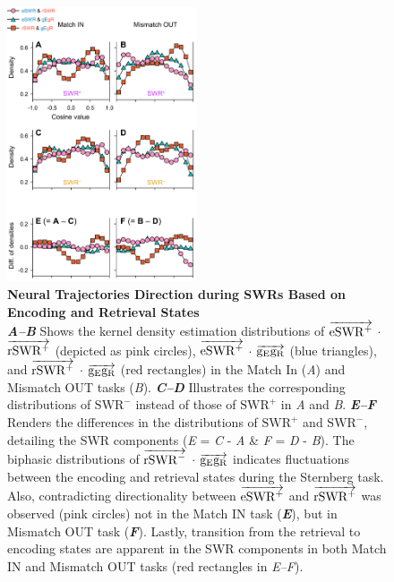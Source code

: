 \documentclass[final,3p,times,twocolumn]{elsarticle}
\begin{document}
        \clearpage
        \begin{figure}[ht]
        	\centering
            \includegraphics[width=0.5\textwidth]{./src/figures/.png/Figure_ID_07.png}
        	\caption{\textbf{
Neural Trajectories Direction during SWRs Based on Encoding and Retrieval States
}
\smallskip
\\
\textbf{\textit{A--B}} Shows the kernel density estimation distributions of $\protect\overrightarrow{{\mathrm{eSWR^+}}}$ $\cdot$ $\protect\overrightarrow{{\mathrm{rSWR^+}}}$ (depicted as pink circles), $\protect\overrightarrow{{\mathrm{eSWR^+}}}$ $\cdot$ $\protect\overrightarrow{{\mathrm{g_{E}g_{R}}}}$ (blue triangles), and $\protect\overrightarrow{{\mathrm{rSWR^+}}}$ $\cdot$ $\protect\overrightarrow{{\mathrm{g_{E}g_{R}}}}$ (red rectangles) in the Match In (\textit{A}) and Mismatch OUT tasks (\textit{B}). \textbf{\textit{C--D}} Illustrates the corresponding distributions of $\mathrm{SWR^-}$ instead of those of $\mathrm{SWR^+}$ in \textit{A} and \textit{B}. \textbf{\textit{E--F}} Renders the differences in the distributions of $\mathrm{SWR^+}$ and $\mathrm{SWR^-}$, detailing the SWR components (\textit{E} = \textit{C} - \textit{A} & \textit{F} = \textit{D} - \textit{B}). The biphasic distributions of $\protect\overrightarrow{{\mathrm{rSWR^-}}}$ $\cdot$ $\protect\overrightarrow{{\mathrm{g_{E}g_{R}}}}$ indicates fluctuations between the encoding and retrieval states during the Sternberg task. Also, contradicting directionality between $\protect\overrightarrow{{\mathrm{eSWR^+}}}$ and $\protect\overrightarrow{{\mathrm{rSWR^+}}}$ was observed (pink circles) not in the Match IN task (\textbf{\textit{E}}), but in Mismatch OUT task (\textbf{\textit{F}}). Lastly, transition from the retrieval to encoding states are apparent in the SWR components in both Match IN and Mismatch OUT tasks (red rectangles in \textit{E--F}).
}
        	\label{fig:07}
        \end{figure}

\end{document}
